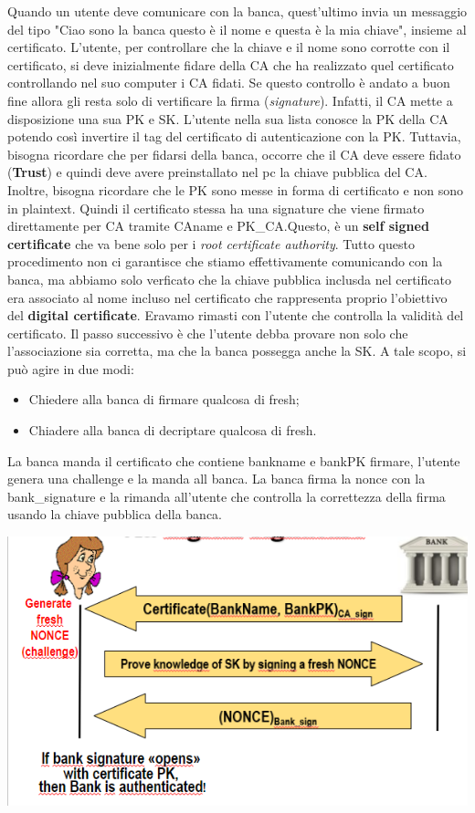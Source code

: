 \documentclass{book}
\theoremstyle{remark}
\begin{document}
Quando un utente deve comunicare con la banca, quest'ultimo invia un messaggio del tipo "Ciao sono la banca questo è il nome e questa è la mia chiave", insieme al certificato\@. L'utente, per controllare che la chiave e il nome sono corrotte con il certificato, si deve inizialmente fidare della CA che ha realizzato quel certificato controllando nel suo computer i CA fidati\@. Se questo controllo è andato a buon fine allora gli resta solo di vertificare la firma (\emph{signature})\@. Infatti, il CA mette a disposizione una sua PK e SK\@. L'utente nella sua lista conosce la PK della CA potendo così invertire il tag del certificato di autenticazione con la PK\@. \newline
Tuttavia, bisogna ricordare che per fidarsi della banca, occorre che il CA deve essere fidato (\textbf{Trust}) e quindi deve avere preinstallato nel pc la chiave pubblica del CA\@. Inoltre, bisogna ricordare che le PK sono messe in forma di certificato e non sono in plaintext\@. Quindi il certificato stessa ha una signature che viene firmato direttamente per CA tramite CAname e PK\_CA\@.Questo, è un \textbf{self signed certificate} che va bene solo per i \emph{root certificate authority}\@.\newline
Tutto questo procedimento non ci garantisce che stiamo effettivamente comunicando con la banca, ma abbiamo solo verficato che la chiave pubblica inclusda nel certificato era associato al nome incluso nel certificato che rappresenta proprio l'obiettivo del \textbf{digital certificate}\@. \newline
Eravamo rimasti con l'utente che controlla la validità del certificato\@. Il passo successivo è che l'utente debba provare non solo che l'associazione sia corretta, ma che la banca possegga anche la SK\@. A tale scopo, si può agire in due modi:\begin{itemize}
	\item Chiedere alla banca di firmare qualcosa di fresh;\@
	\item Chiadere alla banca di decriptare qualcosa di fresh\@.
\end{itemize}
La banca manda il certificato che contiene bankname e bankPK firmare, l'utente genera una challenge e la manda all banca\@. La banca firma la nonce con la bank\_signature e la rimanda all'utente che controlla la correttezza della firma usando la chiave pubblica della banca\@.
\begin{center}
	\includegraphics[scale=0.5]{2021-12-06-10-46-11.png}
\end{center}
\end{document}
